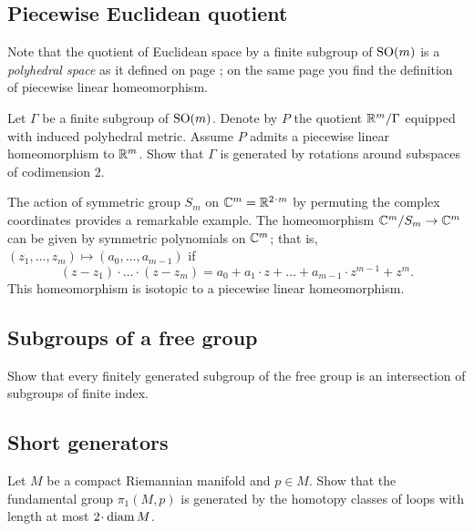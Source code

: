 \subsection*{Piecewise Euclidean quotient}\label{Piecewise Euclidean quotient}

Note that the quotient of Euclidean space by a finite subgroup of $\mathrm{SO}(m)$ is a {}\emph{polyhedral space} as it defined on page \pageref{piecewise linear map};
on the same page you find the definition of piecewise linear homeomorphism.


\begin{pr}
Let $\Gamma$ be a finite subgroup of $\mathrm{SO}(m)$.
Denote by $P$ the quotient $\mathbb{R}^m/\Gamma$ equipped with induced
polyhedral metric.
Assume $P$ admits a piecewise linear homeomorphism to $\mathbb{R}^m$.
Show that $\Gamma$ is generated by rotations  around subspaces of codimension $2$.
\end{pr}

The action of symmetric group $S_m$ on $\CC^m=\RR^{2\cdot m}$ by permuting the complex coordinates provides a remarkable example.
The homeomorphism $\mathbb{C}^m/S_m\to \mathbb{C}^m$ can be given by symmetric polynomials on $\mathbb{C}^m$;
that is, $(z_1,\dots,z_m)\mapsto (a_0,\dots,a_{m-1})$ if
\[(z-z_1)\cdot\dots\cdot(z-z_m)=a_0+a_1\cdot z+\dots+a_{m-1}\cdot z^{m-1}+z^m.\]
This homeomorphism is isotopic to a piecewise linear homeomorphism.

\subsection*{Subgroups of a free group}\label{Subgroups of free group} 

\begin{pr}
Show that every finitely generated subgroup of the free group 
is an intersection of subgroups of finite index.
\end{pr}

\subsection*{Short generators\easy}\label{Lengths of generators of the fundamental group}

\begin{pr}
Let $M$ be a compact Riemannian manifold and $p\in M$.
Show that the fundamental group $\pi_1(M,p)$
is generated by the homotopy classes of loops with length at most $2\cdot\diam M$.
\end{pr}

